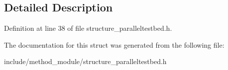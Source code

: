 \subsection{Detailed Description}


Definition at line 38 of file structure\-\_\-paralleltestbed.\-h.



The documentation for this struct was generated from the following file\-:\begin{DoxyCompactItemize}
\item 
include/method\-\_\-module/structure\-\_\-paralleltestbed.\-h\end{DoxyCompactItemize}
